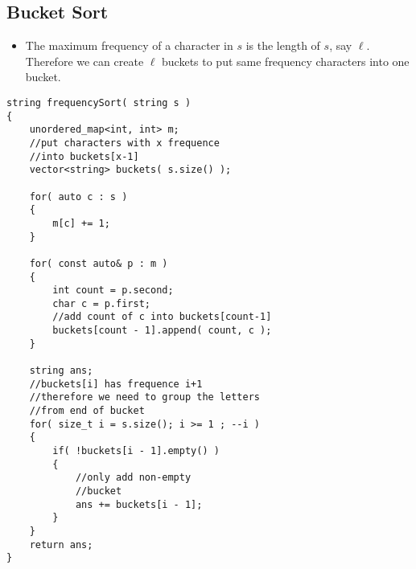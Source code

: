 \subsection{Bucket Sort}
\begin{itemize}
\item The maximum frequency of a character in $s$ is the length of $s$, say $\ell$. Therefore we can create $\ell$ buckets to put same frequency characters into one bucket.
\end{itemize}

\setcounter{lstlisting}{0}
\begin{lstlisting}[style=customc, caption={Bucket Sort}]
string frequencySort( string s )
{
    unordered_map<int, int> m;
    //put characters with x frequence
    //into buckets[x-1]
    vector<string> buckets( s.size() );

    for( auto c : s )
    {
        m[c] += 1;
    }

    for( const auto& p : m )
    {
        int count = p.second;
        char c = p.first;
        //add count of c into buckets[count-1]
        buckets[count - 1].append( count, c );
    }

    string ans;
    //buckets[i] has frequence i+1
    //therefore we need to group the letters
    //from end of bucket
    for( size_t i = s.size(); i >= 1 ; --i )
    {
        if( !buckets[i - 1].empty() )
        {
            //only add non-empty
            //bucket
            ans += buckets[i - 1];
        }
    }
    return ans;
}
\end{lstlisting}